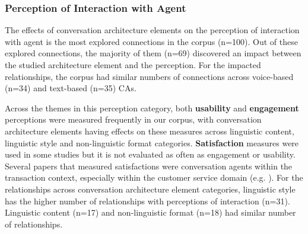\documentclass[sigconf,screen,review, anonymous]{acmart}
\newcommand{\cmt}[1]{}%
\begin{document}


\subsubsection{Perception of Interaction with Agent}

The effects of conversation architecture elements on the perception of interaction with agent is the most explored connections in the corpus (n=100). Out of these explored connections, the majority of them (n=69) discovered an impact between the studied architecture element and the perception. For the impacted relationships, the corpus had similar numbers of connections across voice-based (n=34) and text-based (n=35) CAs.

Across the themes in this perception category, both \textbf{usability} and \textbf{engagement} perceptions were measured frequently in our corpus, with conversation architecture elements having effects on these measures across linguistic content, linguistic style and non-linguistic format categories. \textbf{Satisfaction} measures were used in some studies but it is not evaluated as often as engagement or usability. Several papers that measured satisfactions were conversation agents within the transaction context, especially within the customer service domain (e.g. \cite{diederich2019emulating}\cmt{[25]}\cite{elsholz2019exploring}\cmt{[61]}\cite{gnewuch2018faster}\cmt{[19]}). For the relationships across conversation architecture element categories, linguistic style has the higher number of relationships with perceptions of interaction (n=31). Linguistic content (n=17) and non-linguistic format (n=18) had similar number of relationships.
\end{document}
